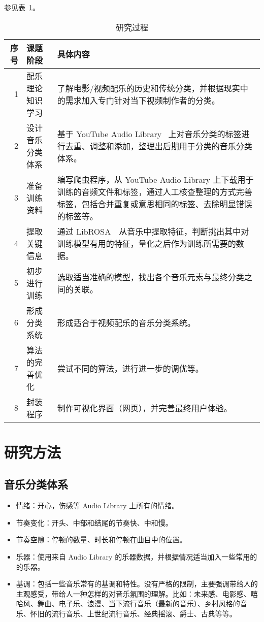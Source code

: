 \documentclass[a4paper,utf8,10pt]{article}
\newcommand{\sept}{\setlength\itemsep{-4pt}}
\begin{document}
参见表~\ref{tab:process}。

\begin{table}[h]
\caption{研究过程} \label{tab:process}
\noindent\begin{tabular}{ r | l | p{13.5cm} }
\hline
序号 & 课题阶段         & 具体内容                                                                                     \\ \hline
   1 & 配乐理论知识学习 & 了解电影/视频配乐的历史和传统分类，并根据现实中的需求加入专门针对当下视频制作者的分类。      \\ \hline
   2 & 设计音乐分类体系 & 基于 YouTube Audio Library~\cite{yal} 上对音乐分类的标签进行去重、调整和添加，整理出后期用于分类的音乐分类体系。\\ \hline
   3 & 准备训练资料     & 编写爬虫程序，从 YouTube Audio Library 上下载用于训练的音频文件和标签，通过人工核查整理的方式完善标签，包括合并重复或意思相同的标签、去除明显错误的标签等。                    \\ \hline
   4 & 提取关键信息     & 通过 LibROSA~\cite{librosa18}~从音乐中提取特征，判断挑出其中对训练模型有用的特征，量化之后作为训练所需要的数据。           \\ \hline
   5 & 初步进行训练     & 选取适当准确的模型，找出各个音乐元素与最终分类之间的关联。                                   \\ \hline
   6 & 形成分类系统     & 形成适合于视频配乐的音乐分类系统。                                                           \\ \hline
   7 & 算法的完善优化   & 尝试不同的算法，进行进一步的调优等。                                                         \\ \hline
   8 & 封装程序         & 制作可视化界面（网页），并完善最终用户体验。                                                 \\ \hline
\end{tabular}
\end{table}

\section{研究方法}

\subsection{音乐分类体系}

\begin{itemize}
  \sept
  \item 情绪：开心，伤感等 Audio Library 上所有的情绪。
  \item 节奏变化：开头、中部和结尾的节奏快、中和慢。
  \item 节奏空隙：停顿的数量、时长和停顿在曲目中的位置。
  \item 乐器：使用来自 Audio Library 的乐器数据，并根据情况适当加入一些常用的的乐器。
  \item 基调：包括一些音乐常有的基调和特性。没有严格的限制，主要强调带给人的主观感受，带给人一种怎样的对音乐氛围的理解。比如：未来感、电影感、嘻哈风、舞曲、电子乐、浪漫、当下流行音乐（最新的音乐）、乡村风格的音乐、怀旧的流行音乐、上世纪流行音乐、经典摇滚、爵士、古典等等。
\end{itemize}
\end{document}
